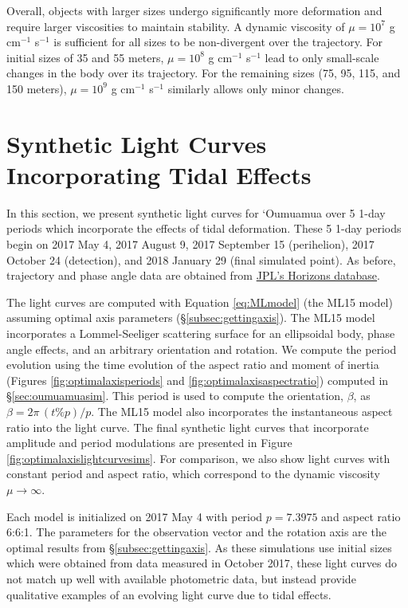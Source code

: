 \documentclass[twocolumn,doublespacing]{aastex631}
\begin{document}
Overall, objects with larger sizes undergo significantly more deformation and require larger viscosities to maintain stability. A dynamic viscosity of $\mu=10^7$ g cm$^{-1}$ s$^{-1}$ is sufficient for all sizes to be non-divergent over the trajectory. For initial sizes of 35 and 55 meters, $\mu=10^8$ g cm$^{-1}$ s$^{-1}$ lead to only small-scale changes in the body over its trajectory. For the remaining sizes (75, 95, 115, and 150 meters), $\mu=10^9$ g cm$^{-1}$ s$^{-1}$ similarly allows only minor changes. 

\section{Synthetic Light Curves Incorporating Tidal Effects}\label{sec:lightcurvesim}

In this section, we present synthetic light curves for `Oumuamua over 5 1-day periods which incorporate the effects of tidal deformation. These 5 1-day periods begin on 2017 May 4, 2017 August 9, 2017 September 15 (perihelion), 2017 October 24 (detection), and 2018 January 29 (final simulated point). As before, trajectory and phase angle data are obtained from \href{https://ssd.jpl.nasa.gov/horizons.cgi}{JPL's Horizons database}. 

The light curves are computed with Equation \ref{eq:MLmodel} (the ML15 model) assuming optimal axis parameters (\S \ref{subsec:gettingaxis}). The ML15 model incorporates a Lommel-Seeliger scattering surface for an ellipsoidal body, phase angle effects, and an arbitrary orientation and rotation. We compute the period evolution using the time evolution of the aspect ratio and moment of inertia (Figures \ref{fig:optimalaxisperiods} and \ref{fig:optimalaxisaspectratio}) computed in \S\ref{sec:oumuamuasim}. This period is used to compute the orientation, $\beta$, as $\beta=2\pi\,(t\%p)/p$. The ML15 model also incorporates the instantaneous aspect ratio into the light curve. The final synthetic light curves that incorporate amplitude and period modulations are presented in Figure \ref{fig:optimalaxislightcurvesims}. For comparison, we also show light curves with constant period and aspect ratio, which correspond to the dynamic viscosity $\mu\rightarrow\infty$.

Each model is initialized on 2017 May 4 with period $p=7.3975$ and aspect ratio 6:6:1. The parameters for the observation vector and the rotation axis are the optimal results from \S\ref{subsec:gettingaxis}. As these simulations use initial sizes which were obtained from data measured in October 2017, these light curves do not match up well with available photometric data, but instead provide qualitative examples of an evolving light curve due to tidal effects. 
\end{document}
